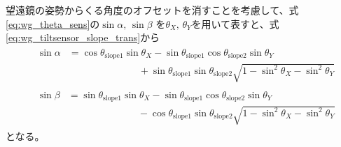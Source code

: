 \documentclass[../../main.tex]{subfiles}
\begin{document}
望遠鏡の姿勢からくる角度のオフセットを消すことを考慮して、式\eqref{eq:wg_theta_sens}の$\sin\alpha,\,\sin\beta$
を$\theta_X,\,\theta_Y$を用いて表すと、式\eqref{eq:wg_tiltsensor_slope_trans}から
\begin{align}
    &\begin{split}
        \sin\alpha &= \cos\theta_{\mathrm{slope}1}\sin\theta_{X}-\sin\theta_{\mathrm{slope}1}\cos\theta_{\mathrm{slope}2}\sin\theta_{Y} \\
                   &\hspace{3cm} +\sin\theta_{\mathrm{slope}1}\sin\theta_{\mathrm{slope}2}\sqrt{1-\sin^2\theta_{X}-\sin^2\theta_{Y}}
    \end{split}
    \label{eq:wg_tiltsensor_slope1} \\
    &\begin{split}
        \sin\beta &= \sin\theta_{\mathrm{slope}1}\sin\theta_{X}-\sin\theta_{\mathrm{slope}1}\cos\theta_{\mathrm{slope}2}\sin\theta_{Y} \\
                  &\hspace{3cm}-\cos\theta_{\mathrm{slope}1}\sin\theta_{\mathrm{slope}2}\sqrt{1-\sin^2\theta_{X}-\sin^2\theta_{Y}}
    \end{split}
    \label{eq:wg_tiltsensor_slope2}
\end{align}
となる。
\end{document}
